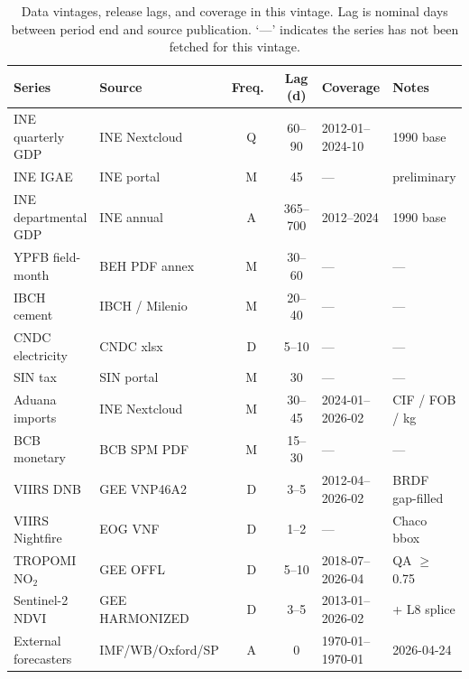 \begin{table}[H]
\centering\scriptsize
\caption{Data vintages, release lags, and coverage in this vintage. Lag is nominal days between period end and source publication. `---' indicates the series has not been fetched for this vintage.}
\label{tab:vintages}
\begin{tabular}{p{2.8cm}p{2.6cm}cclp{2.2cm}}
\toprule
Series & Source & Freq.\ & Lag (d) & Coverage & Notes \\
\midrule
INE quarterly GDP & INE Nextcloud & Q & 60--90 & 2012-01--2024-10 & 1990 base \\
INE IGAE & INE portal & M & 45 & --- & preliminary \\
INE departmental GDP & INE annual & A & 365--700 & 2012--2024 & 1990 base \\
YPFB field-month & BEH PDF annex & M & 30--60 & --- & --- \\
IBCH cement & IBCH / Milenio & M & 20--40 & --- & --- \\
CNDC electricity & CNDC xlsx & D & 5--10 & --- & --- \\
SIN tax & SIN portal & M & 30 & --- & --- \\
Aduana imports & INE Nextcloud & M & 30--45 & 2024-01--2026-02 & CIF / FOB / kg \\
BCB monetary & BCB SPM PDF & M & 15--30 & --- & --- \\
VIIRS DNB & GEE VNP46A2 & D & 3--5 & 2012-04--2026-02 & BRDF gap-filled \\
VIIRS Nightfire & EOG VNF & D & 1--2 & --- & Chaco bbox \\
TROPOMI NO$_2$ & GEE OFFL & D & 5--10 & 2018-07--2026-04 & QA $\geq$ 0.75 \\
Sentinel-2 NDVI & GEE HARMONIZED & D & 3--5 & 2013-01--2026-02 & + L8 splice \\
External forecasters & IMF/WB/Oxford/SP & A & 0 & 1970-01--1970-01 & 2026-04-24 \\
\bottomrule
\end{tabular}
\end{table}